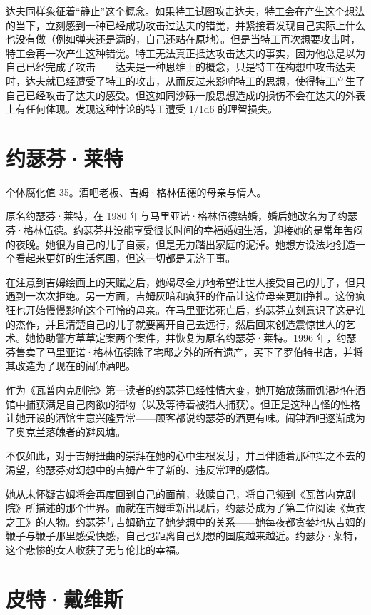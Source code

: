 达夫同样象征着“静止”这个概念。如果特工试图攻击达夫，特工会在产生这个想法的当下，立刻感到一种已经成功攻击过达夫的错觉，并紧接着发现自己实际上什么也没有做（例如弹夹还是满的，自己还站在原地）。但是当特工再次想要攻击时，特工会再一次产生这种错觉。特工无法真正抵达攻击达夫的事实，因为他总是以为自己已经完成了攻击——达夫是一种思维上的概念，只是特工在构想中攻击达夫时，达夫就已经遭受了特工的攻击，从而反过来影响特工的思想，使得特工产生了自己已经攻击了达夫的感受。但这如同沙砾一般思想造成的损伤不会在达夫的外表上有任何体现。发现这种悖论的特工遭受 1/1d6 的理智损失。

\section{约瑟芬·莱特}

个体腐化值 35。酒吧老板、吉姆·格林伍德的母亲与情人。

原名约瑟芬·莱特，在 1980 年与马里亚诺·格林伍德结婚，婚后她改名为了约瑟芬·格林伍德。约瑟芬并没能享受很长时间的幸福婚姻生活，迎接她的是常年苦闷的夜晚。她很为自己的儿子自豪，但是无力踏出家庭的泥淖。她想方设法地创造一个看起来更好的生活氛围，但这一切都是无济于事。

在注意到吉姆绘画上的天赋之后，她竭尽全力地希望让世人接受自己的儿子，但只遇到一次次拒绝。另一方面，吉姆灰暗和疯狂的作品让这位母亲更加挣扎。这份疯狂也开始慢慢影响这个可怜的母亲。在马里亚诺死亡后，约瑟芬立刻意识了这是谁的杰作，并且清楚自己的儿子就要离开自己去远行，然后回来创造震惊世人的艺术。她协助警方草草定案两个案件，并恢复为原名约瑟芬·莱特。1996 年，约瑟芬售卖了马里亚诺·格林伍德除了宅邸之外的所有遗产，买下了罗伯特书店，并将其改造为了现在的闹钟酒吧。

作为《瓦普内克剧院》第一读者的约瑟芬已经性情大变，她开始放荡而饥渴地在酒馆中捕获满足自己肉欲的猎物（以及等待着被猎人捕获）。但正是这种古怪的性格让她开设的酒馆生意兴隆异常——顾客都说约瑟芬的酒更有味。闹钟酒吧逐渐成为了奥克兰落魄者的避风塘。

不仅如此，对于吉姆扭曲的崇拜在她的心中生根发芽，并且伴随着那种挥之不去的渴望，约瑟芬对幻想中的吉姆产生了新的、违反常理的感情。

她从未怀疑吉姆将会再度回到自己的面前，救赎自己，将自己领到《瓦普内克剧院》所描述的那个世界。而就在吉姆重新出现后，约瑟芬成为了第二位阅读《黄衣之王》的人物。约瑟芬与吉姆确立了她梦想中的关系——她每夜都贪婪地从吉姆的鞭子与鞭子那里感受快感，自己也距离自己幻想的国度越来越近。约瑟芬·莱特，这个悲惨的女人收获了无与伦比的幸福。

\section{皮特·戴维斯}

